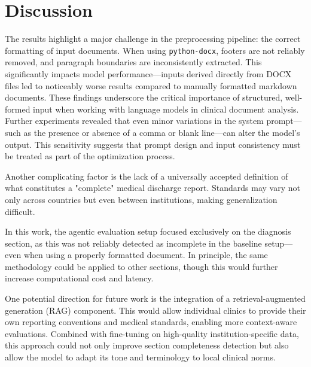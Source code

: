 \section{Discussion}

The results highlight a major challenge in the preprocessing pipeline: the
correct formatting of input documents. When using \texttt{python-docx}, footers
are not reliably removed, and paragraph boundaries are inconsistently
extracted. This significantly impacts model performance—inputs derived directly
from DOCX files led to noticeably worse results compared to manually formatted
markdown documents. These findings underscore the critical importance of
structured, well-formed input when working with language models in clinical
document analysis.\cite{p1}
Further experiments revealed that even minor variations in the system prompt—such as the presence or absence of a comma or blank line—can alter the model's output. This sensitivity suggests that prompt design and input consistency must be treated as part of the optimization process.

Another complicating factor is the lack of a universally accepted definition of what constitutes a "complete" medical discharge report. Standards may vary not only across countries but even between institutions, making generalization difficult.

In this work, the agentic evaluation setup focused exclusively on the diagnosis section, as this was not reliably detected as incomplete in the baseline setup—even when using a properly formatted document. In principle, the same methodology could be applied to other sections, though this would further increase computational cost and latency.

One potential direction for future work is the integration of a retrieval-augmented generation (RAG) component. This would allow individual clinics to provide their own reporting conventions and medical standards, enabling more context-aware evaluations. Combined with fine-tuning on high-quality institution-specific data, this approach could not only improve section completeness detection but also allow the model to adapt its tone and terminology to local clinical norms.

